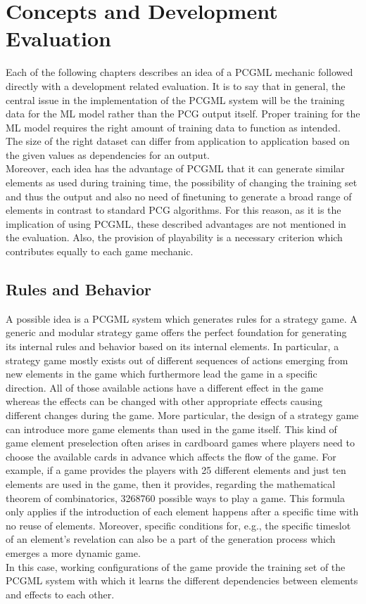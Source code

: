 \documentclass[MGS,Master,english]{twbook}%
\begin{document}
\section{Concepts and Development Evaluation}
Each of the following chapters describes an idea of a PCGML mechanic followed directly with a development related evaluation. It is to say that in general, the central issue in the implementation of the PCGML system will be the training data for the ML model rather than the PCG output itself. Proper training for the ML model requires the right amount of training data to function as intended. The size of the right dataset can differ from application to application based on the given values as dependencies for an output. \\
Moreover, each idea has the advantage of PCGML that it can generate similar elements as used during training time, the possibility of changing the training set and thus the output and also no need of finetuning to generate a broad range of elements in contrast to standard PCG algorithms. For this reason, as it is the implication of using PCGML, these described advantages are not mentioned in the evaluation. Also, the provision of playability is a necessary criterion which contributes equally to each game mechanic.

\subsection{Rules and Behavior} \label{idea::rulesAndBehavior}
A possible idea is a PCGML system which generates rules for a strategy game. A generic and modular strategy game offers the perfect foundation for generating its internal rules and behavior based on its internal elements. In particular, a strategy game mostly exists out of different sequences of actions emerging from new elements in the game which furthermore lead the game in a specific direction. All of those available actions have a different effect in the game whereas the effects can be changed with other appropriate effects causing different changes during the game. More particular, the design of a strategy game can introduce more game elements than used in the game itself. This kind of game element preselection often arises in cardboard games where players need to choose the available cards in advance which affects the flow of the game. For example, if a game provides the players with 25 different elements and just ten elements are used in the game, then it provides, regarding the mathematical theorem of combinatorics, 3268760 possible ways to play a game. This formula only applies if the introduction of each element happens after a specific time with no reuse of elements. Moreover, specific conditions for, e.g., the specific timeslot of an element's revelation can also be a part of the generation process which emerges a more dynamic game.\\
In this case, working configurations of the game provide the training set of the PCGML system with which it learns the different dependencies between elements and effects to each other. 
\end{document}
